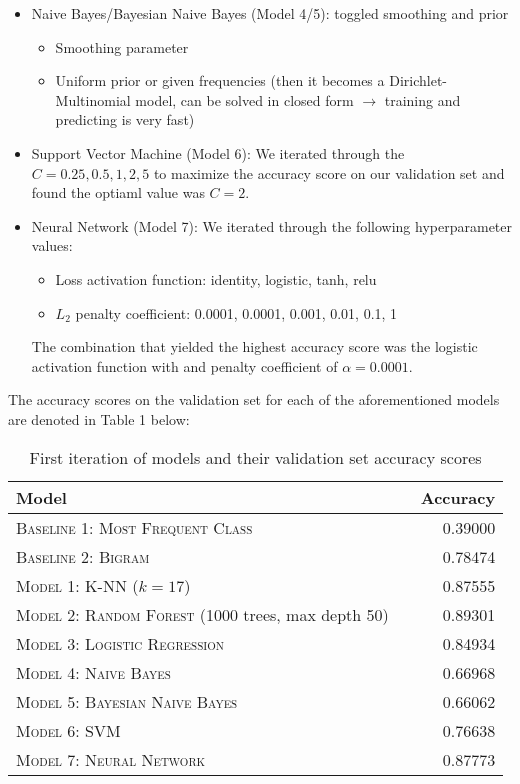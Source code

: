\documentclass[11pt]{article}
\begin{document}
\begin{itemize}
      \item Naive Bayes/Bayesian Naive Bayes (Model 4/5): toggled smoothing and prior
      \begin{itemize}
          \item Smoothing parameter
          \item Uniform prior or given frequencies (then it becomes a Dirichlet-Multinomial model, can be solved in closed form $\rightarrow$ training and predicting is very fast)
      \end{itemize}
      
      \item Support Vector Machine (Model 6): We iterated through the $C=0.25, 0.5, 1, 2, 5$ to maximize the accuracy score on our validation set and found the optiaml value was $C=2$.
      
      \item Neural Network (Model 7): We iterated through the following hyperparameter values:
      \begin{itemize}
          \item Loss activation function: identity, logistic, tanh, relu
          \item $L_2$ penalty coefficient: 0.0001, 0.0001, 0.001, 0.01, 0.1, 1
      \end{itemize}
      The combination that yielded the highest accuracy score was the logistic activation function with and penalty coefficient of $\alpha=0.0001$.
      
  \end{itemize}
  
  The accuracy scores on the validation set for each of the aforementioned models are denoted in Table 1 below:
    \begin{table}[h!]
        \centering
        \begin{tabular}{llr}
         \toprule
         Model &  & Accuracy \\
         \midrule
         \textsc{Baseline 1: Most Frequent Class} & & 0.39000 \\
         \textsc{Baseline 2: Bigram} & & 0.78474 \\
         \textsc{Model 1: K-NN} ($k=17$) & & 0.87555 \\
         \textsc{Model 2: Random Forest} (1000 trees, max depth 50) & & 0.89301 \\
         \textsc{Model 3: Logistic Regression} & & 0.84934 \\
         \textsc{Model 4: Naive Bayes} & &  0.66968\\
         \textsc{Model 5: Bayesian Naive Bayes} & &  0.66062\\
         \textsc{Model 6: SVM} & & 0.76638 \\
         \textsc{Model 7: Neural Network} & & 0.87773 \\
         \bottomrule
        \end{tabular}
        \caption{\label{tab:results} First iteration of models and their validation set accuracy scores}
    \end{table}
\end{document}
